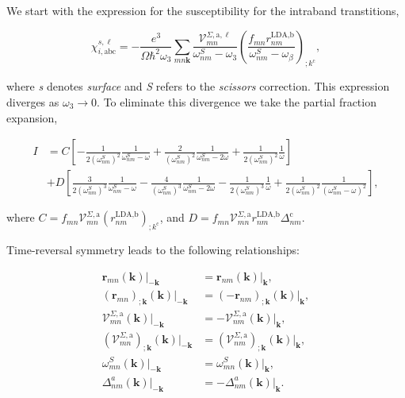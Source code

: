\documentclass[10pt]{article}
\begin{document}
We start with the expression for the susceptibility for the intraband transtitions,

\begin{equation}\label{chii}
\chi_{i,\text{a}\text{b}\text{c}}^{s,\ell}=-\frac{e^3}{\Omega\hbar^2\omega_3}\sum_{mn\mathbf{k}}\frac{\mathcal{V}_{mn}^{\Sigma,\text{a},\ell}}{\omega^S_{nm}-\omega_3}\left(\frac{f_{mn}r^{\text{LDA,b}}_{nm}}{\omega^S_{nm}-\omega_\beta}\right)_{;k^{\text{c}}},
\end{equation} 

where \emph{s} denotes \emph{surface} and \emph{S} refers to the \emph{scissors} correction. This expression diverges as $\omega_{3} \rightarrow 0$. To eliminate this divergence we take the partial fraction expansion,

\begin{align}\label{pfi} 
I & = C \left[-\frac{1}{2(\omega^{S}_{nm})^{2}}\frac{1}{\omega^{S}_{nm}-\omega}+\frac{2}{(\omega^{S}_{nm})^{2}}\frac{1}{\omega^{S}_{nm}-2\omega}+\frac{1}{2(\omega^{S}_{nm})^{2}}\frac{1}{\omega}\right]\nonumber\\
  & + D \left[\frac{3}{2(\omega^{S}_{nm})^{3}}\frac{1}{\omega^{S}_{nm}-\omega} - \frac{4}{(\omega^{S}_{nm})^{3}}\frac{1}{\omega^{S}_{nm}-2\omega} - \frac{1}{2(\omega^{S}_{nm})^{3}}\frac{1}{\omega} + \frac{1}{2(\omega^{S}_{nm})^{2}}\frac{1}{(\omega^{S}_{nm}-\omega)^2}\right],
\end{align} 

where $C = f_{mn}\mathcal{V}^{\Sigma,\text{a}}_{mn}(r^{\text{LDA,b}}_{nm})_{;k^{\text{c}}}$, and $D=f_{mn}\mathcal{V}^{\Sigma,\text{a}}_{mn}r^{\text{LDA,b}}_{nm}\Delta^{\text{c}}_{nm}$.

Time-reversal symmetry leads to the following relationships:

\begin{align}\label{time_reversal}
\mathbf{r}_{mn}(\mathbf{k})|_{-\mathbf{k}}                                          &=  \mathbf{r}_{nm}(\mathbf{k})|_{\mathbf{k}},                                      \nonumber\\
(\mathbf{r}_{mn})_{;\mathbf{k}}(\mathbf{k})|_{-\mathbf{k}}                          &=  (-\mathbf{r}_{nm})_{;\mathbf{k}}(\mathbf{k})|_{\mathbf{k}},                     \nonumber\\
\mathcal{V}^{\Sigma,\text{a}}_{mn}(\mathbf{k})|_{-\mathbf{k}}                       &=  -\mathbf{\mathcal{V}}_{nm}^{\Sigma,\text{a}}(\mathbf{k})|_{\mathbf{k}},         \nonumber\\
(\mathcal{V}^{\Sigma,\text{a}}_{mn})_{;\mathbf{k}}(\mathbf{k})|_{-\mathbf{k}}       &=  (\mathbf{\mathcal{V}}_{nm}^{\Sigma,\text{a}})_{;\mathbf{k}}(\mathbf{k})|_{\mathbf{k}},   \\
\omega_{mn}^{S}(\mathbf{k})|_{-\mathbf{k}}                                          &=  \omega_{mn}^{S}(\mathbf{k})|_{\mathbf{k}},                                      \nonumber\\
\Delta^a_{nm}(\mathbf{k})|_{-\mathbf{k}}                                            &=  -\Delta^a_{nm}(\mathbf{k})|_{\mathbf{k}}.                                       \nonumber
\end{align}
\end{document}
